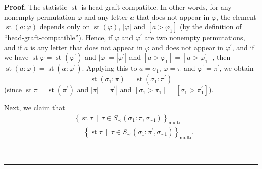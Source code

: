 \documentclass[numbers=enddot,12pt,final,onecolumn,notitlepage]{scrartcl}%
\theoremstyle{definition}
\newenvironment{proof}[1][Proof]{\noindent\textbf{#1.} }{\ \rule{0.5em}{0.5em}}
\begin{document}
\begin{proof}
The statistic $\operatorname{st}$ is head-graft-compatible. In other words,
for any nonempty permutation $\varphi$ and any letter $a$ that does not appear
in $\varphi$, the element $\operatorname{st}\left(  a:\varphi\right)  $
depends only on $\operatorname{st}\left(  \varphi\right)  $, $\left\vert
\varphi\right\vert $ and $\left[  a>\varphi_{1}\right]  $ (by the definition
of \textquotedblleft head-graft-compatible\textquotedblright). Hence,
if $\varphi$ and $\varphi^{\prime}$ are two nonempty permutations, and if $a$
is any letter that does not appear in $\varphi$ and does not appear in
$\varphi^{\prime}$, and if we have $\operatorname{st} \varphi
=\operatorname{st}\left(  \varphi^{\prime}\right)  $ and $\left\vert
\varphi\right\vert =\left\vert \varphi^{\prime}\right\vert $ and $\left[
a>\varphi_{1}\right]  =\left[  a>\varphi_{1}^{\prime}\right]  $, then
$\operatorname{st}\left(  a:\varphi\right)  =\operatorname{st}\left(
a:\varphi^{\prime}\right)  $. Applying this to $a=\sigma_{1}$, $\varphi=\pi$
and $\varphi^{\prime}=\pi^{\prime}$, we obtain
\[
\operatorname{st}\left(  \sigma_{1}:\pi\right)  =\operatorname{st}\left(
\sigma_{1}:\pi^{\prime}\right)
\]
(since $\operatorname{st} \pi   =\operatorname{st}\left(
\pi^{\prime}\right)  $ and $\left\vert \pi\right\vert =\left\vert \pi^{\prime
}\right\vert $ and $\left[  \sigma_{1}>\pi_{1}\right]  =\left[  \sigma_{1}%
>\pi_{1}^{\prime}\right]  $).

Next, we claim that%
\begin{align}
&\left\{  \operatorname{st} \tau   \ \mid\ \tau\in S_{\prec
}\left(  \sigma_{1}:\pi,\sigma_{\sim1}\right)  \right\}
_{\operatorname*{multi}}
\nonumber\\
&=\left\{
\operatorname{st} \tau   \ \mid\ \tau\in S_{\prec}\left(
\sigma_{1}:\pi^{\prime},\sigma_{\sim1}\right)  \right\}
_{\operatorname*{multi}}.
\label{pf.thm.head-comp.LRcomp.c1.pf.5}%
\end{align}



\end{proof}
\end{document}
